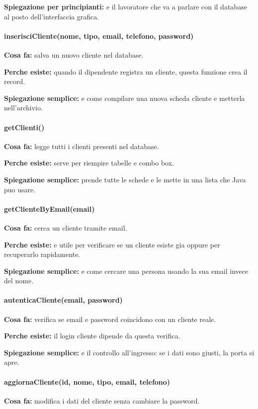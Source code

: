\documentclass[12pt,a4paper]{article}
\begin{document}
\textbf{Spiegazione per principianti:} e il lavoratore che va a parlare con il database al posto dell'interfaccia grafica.

\paragraph{inserisciCliente(nome, tipo, email, telefono, password)}
\textbf{Cosa fa:} salva un nuovo cliente nel database.

\textbf{Perche esiste:} quando il dipendente registra un cliente, questa funzione crea il record.

\textbf{Spiegazione semplice:} e come compilare una nuova scheda cliente e metterla nell'archivio.

\paragraph{getClienti()}
\textbf{Cosa fa:} legge tutti i clienti presenti nel database.

\textbf{Perche esiste:} serve per riempire tabelle e combo box.

\textbf{Spiegazione semplice:} prende tutte le schede e le mette in una lista che Java puo usare.

\paragraph{getClienteByEmail(email)}
\textbf{Cosa fa:} cerca un cliente tramite email.

\textbf{Perche esiste:} e utile per verificare se un cliente esiste gia oppure per recuperarlo rapidamente.

\textbf{Spiegazione semplice:} e come cercare una persona usando la sua email invece del nome.

\paragraph{autenticaCliente(email, password)}
\textbf{Cosa fa:} verifica se email e password coincidono con un cliente reale.

\textbf{Perche esiste:} il login cliente dipende da questa verifica.

\textbf{Spiegazione semplice:} e il controllo all'ingresso: se i dati sono giusti, la porta si apre.

\paragraph{aggiornaCliente(id, nome, tipo, email, telefono)}
\textbf{Cosa fa:} modifica i dati del cliente senza cambiare la password.
\end{document}
